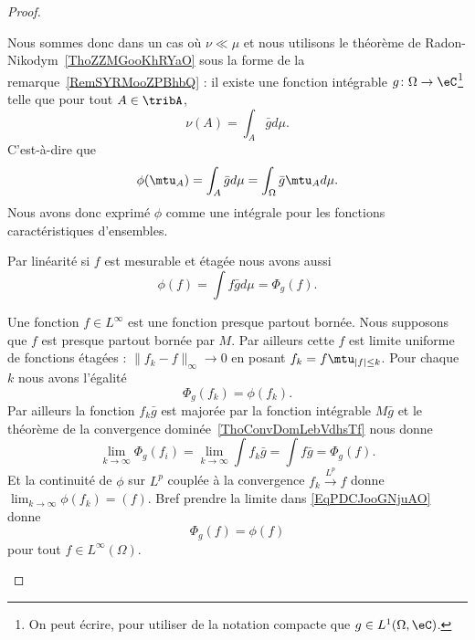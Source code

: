 \begin{proof}
\begin{subproof}

    Nous sommes donc dans un cas où \( \nu\ll\mu\) et nous utilisons le théorème de Radon-Nikodym~\ref{ThoZZMGooKhRYaO} sous la forme de la remarque~\ref{RemSYRMooZPBhbQ} : il existe une fonction intégrable \( g\colon \Omega\to \eC\)\footnote{On peut écrire, pour utiliser de la notation compacte que \(  g\in L^1(\Omega,\eC)\).} telle que pour tout \( A\in\tribA\),
    \begin{equation}
        \nu(A)=\int_A\bar gd\mu.
    \end{equation}
    C'est-à-dire que
    \begin{equation}
        \phi(\mtu_A)=\int_A\bar gd\mu=\int_{\Omega}\bar g\mtu_Ad\mu.
    \end{equation}
    Nous avons donc exprimé \( \phi\) comme une intégrale pour les fonctions caractéristiques d'ensembles.


    Par linéarité si \( f\) est mesurable et étagée nous avons aussi
    \begin{equation}
        \phi(f)=\int f\bar gd\mu=\Phi_g(f).
    \end{equation}


    Une fonction \( f\in L^{\infty}\) est une fonction presque partout bornée. Nous supposons que \( f\) est presque partout bornée par \( M\). Par ailleurs cette \( f\) est limite uniforme de fonctions étagées : \( \| f_k-f \|_{\infty}\to 0\) en posant \( f_k=f\mtu_{| f |\leq k}\). Pour chaque \( k \) nous avons l'égalité
    \begin{equation}    \label{EqPDCJooGNjuAO}
        \Phi_g(f_k)=\phi(f_k).
    \end{equation}
    Par ailleurs la fonction \( f_k\bar g\) est majorée par la fonction intégrable \( M\bar g\) et le théorème de la convergence dominée~\ref{ThoConvDomLebVdhsTf} nous donne
    \begin{equation}
        \lim_{k\to \infty} \Phi_g(f_i)=\lim_{k\to \infty} \int f_k\bar g=\int f\bar g=\Phi_g(f).
    \end{equation}
    Et la continuité de \( \phi\) sur \( L^p\) couplée à la convergence \( f_k\stackrel{L^p}{\longrightarrow}f\) donne \( \lim_{k\to \infty} \phi(f_k)=(f)\). Bref prendre la limite dans \eqref{EqPDCJooGNjuAO} donne
    \begin{equation}
        \Phi_g(f)=\phi(f)
    \end{equation}
    pour tout \( f\in L^{\infty}(\Omega)\).


\end{subproof}
\end{proof}
